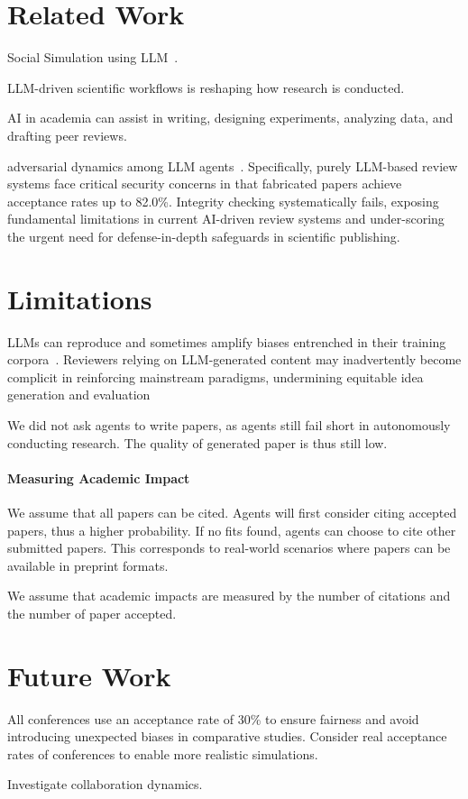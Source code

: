 \documentclass{article}
\begin{document}
\section{Related Work}

Social Simulation using LLM~\cite{anthis2025llm}.

LLM-driven scientific workflows is reshaping how research is conducted.

AI in academia can assist in writing, designing experiments, analyzing data, and drafting peer reviews.

adversarial dynamics among LLM agents~\cite{jiang2025badscientist}. Specifically, purely LLM-based review systems face critical security concerns in that fabricated papers
achieve acceptance rates up to 82.0\%. Integrity checking systematically fails, exposing fundamental limitations in current AI-driven review systems and under-scoring the urgent need for defense-in-depth
safeguards in scientific publishing.




\section{Limitations}

LLMs can reproduce and sometimes amplify biases entrenched in their training corpora~\cite{}. Reviewers relying on LLM-generated content may inadvertently become complicit in reinforcing mainstream paradigms, undermining equitable idea generation and evaluation~\citep{zhang2025evolving}


We did not ask agents to write papers, as agents still fail short in autonomously conducting research. The quality of generated paper is thus still low. 

\paragraph{Measuring Academic Impact}

We assume that all papers can be cited. Agents will first consider citing accepted papers, thus a higher probability. If no fits found, agents can choose to cite other submitted papers. This corresponds to real-world scenarios where papers can be available in preprint formats.

We assume that academic impacts are measured by the number of citations and the number of paper accepted. 

\section{Future Work}
All conferences use an acceptance rate of 30\% to ensure fairness and avoid introducing unexpected biases in comparative studies. Consider real acceptance rates of conferences to enable more realistic simulations.


Investigate collaboration dynamics. 

% 




\appendix


\end{document}
